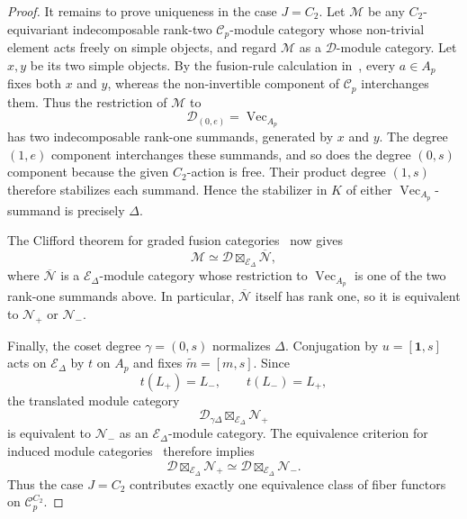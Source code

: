 \documentclass[12pt]{amsart}
\theoremstyle{plain}
\theoremstyle{definition} %
\theoremstyle{remark} %
\DeclareMathOperator{\VecCat}{Vec}
\newcommand{\Vect}[1]{\VecCat_{#1}}
\newcommand{\cC}{\mathcal{C}}
\newcommand{\cD}{\mathcal{D}}
\newcommand{\cE}{\mathcal{E}}
\newcommand{\cM}{\mathcal{M}}
\newcommand{\cN}{\mathcal{N}}
\begin{document}
\begin{proof}
It remains to prove uniqueness in the case $J=C_2$. Let $\cM$ be any
$C_2$-equivariant indecomposable rank-two $\cC_p$-module category whose
non-trivial element acts freely on simple objects, and regard $\cM$ as a
$\cD$-module category. Let $x,y$ be its two simple objects. By the fusion-rule
calculation in~\cite[Lemma~4.3]{Nik08}, every $a\in A_p$ fixes both $x$ and
$y$, whereas the non-invertible component of $\cC_p$ interchanges them.
Thus the restriction of $\cM$ to
\[
\cD_{(0,e)}=\Vect{A_p}
\]
has two indecomposable rank-one summands, generated by $x$ and $y$. The
degree $(1,e)$ component interchanges these summands, and so does the degree
$(0,s)$ component because the given $C_2$-action is free. Their product degree
$(1,s)$ therefore stabilizes each summand. Hence the stabilizer in $K$ of either
$\Vect{A_p}$-summand is precisely $\Delta$.

The Clifford theorem for graded fusion categories~\cite[Corollary~4.4]{Gal12}
now gives
\[
\cM\simeq
\cD\boxtimes_{\cE_\Delta}\overline{\cN},
\]
where $\overline{\cN}$ is a $\cE_\Delta$-module category whose restriction to
$\Vect{A_p}$ is one of the two rank-one summands above. In particular,
$\overline{\cN}$ itself has rank one, so it is equivalent to $\cN_+$ or
$\cN_-$.

Finally, the coset degree $\gamma=(0,s)$ normalizes $\Delta$. Conjugation by
$u=[\mathbf1,s]$ acts on $\cE_\Delta$ by $t$ on $A_p$ and fixes
$\widetilde m=[m,s]$. Since
\[
t(L_+)=L_-,
\qquad
t(L_-)=L_+,
\]
the translated module category
\[
\cD_{\gamma\Delta}\boxtimes_{\cE_\Delta}\cN_+
\]
is equivalent to $\cN_-$ as an $\cE_\Delta$-module category. The equivalence
criterion for induced module categories~\cite[Proposition~4.6]{Gal12}
therefore implies
\[
\cD\boxtimes_{\cE_\Delta}\cN_+
\simeq
\cD\boxtimes_{\cE_\Delta}\cN_-.
\]
Thus the case $J=C_2$ contributes exactly one equivalence class of fiber
functors on $\cC_p^{C_2}$.
\end{proof}
\end{document}
